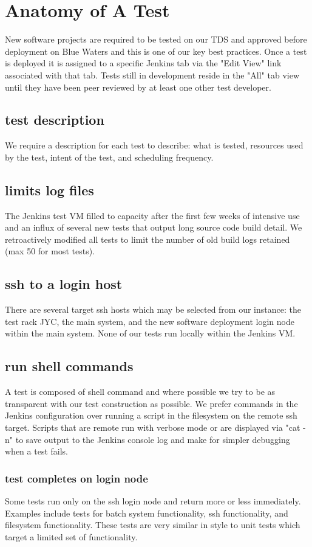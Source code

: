 \documentclass[10pt, conference, compsocconf]{IEEEtran}
\begin{document}
\section{Anatomy of A Test}
\label{sec:TestAnatomy}
New software projects are required to be tested on our TDS and approved before deployment on Blue Waters and this is one of our key best practices.  Once a test is deployed it is assigned to a specific Jenkins tab via the "Edit View" link associated with that tab.  Tests still in development reside in the "All" tab view until they have been peer reviewed by at least one other test developer.
\subsection{test description}
We require a description for each test to describe: what is tested, resources used by the test, intent of the test, and scheduling frequency.
\subsection{limits log files}
The Jenkins test VM filled to capacity after the first few weeks of intensive use and an influx of several new tests that output long source code build detail.  We retroactively modified all tests to limit the number of old build logs retained (max 50 for most tests). 
\subsection{ssh to a login host}
There are several target ssh hosts which may be selected from our instance: the test rack JYC, the main system, and the new software deployment login node within the main system.  None of our tests run locally within the Jenkins VM.
\subsection{run shell commands}
A test is composed of shell command and where possible we try to be as transparent with our test construction as possible.  We prefer commands in the Jenkins configuration over running a script in the filesystem on the remote ssh target.  Scripts that are remote run with verbose mode or are displayed via "cat -n" to save output to the Jenkins console log and make for simpler debugging when a test fails.
\subsubsection{test completes on login node}
Some tests run only on the ssh login node and return more or less immediately.  Examples include tests for batch system functionality, ssh functionality, and filesystem functionality.  These tests are very similar in style to unit tests which target a limited set of functionality.
\end{document}
